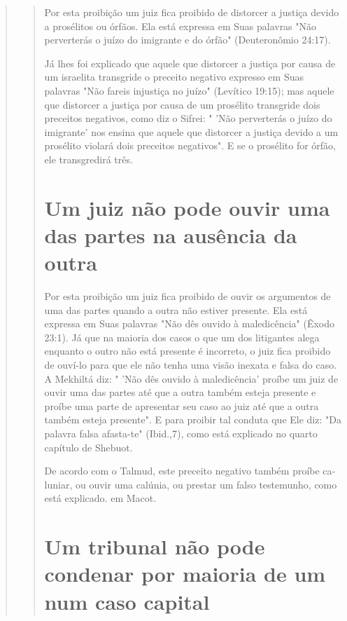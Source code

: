 \begin{quote}
\begin{quote}
Por esta proibição um juiz fica proibido de distorcer a justiça devi­do
a prosélitos ou órfãos. Ela está expressa em Suas palavras "Não
perverterás o juízo do imigrante e do órfão" (Deuteronômio 24:17).

Já lhes foi explicado que aquele que distorcer a justiça por causa de um
israelita transgride o preceito negativo expresso em Suas palavras "Não
fa­reis injustiça no juízo" (Levítico 19:15); mas aquele que distorcer a
justiça por causa de um prosélito transgride dois preceitos negativos,
como diz o Sifrei: " 'Não perverterás o juízo do imigrante' nos ensina
que aquele que distorcer a justiça devido a um prosélito violará dois
preceitos negativos". E se o proséli­to for órfão, ele transgredirá
três.

\section{Um juiz não pode ouvir uma das partes na ausência da outra}

Por esta proibição um juiz fica proibido de ouvir os argumentos de uma
das partes quando a outra não estiver presente. Ela está expressa em
Suas palavras "Não dês ouvido à maledicência" (Êxodo 23:1). Já que na
maioria dos casos o que um dos litigantes alega enquanto o outro não
está presente é incor­reto, o juiz fica proibido de ouví-lo para que ele
não tenha uma visão inexata e falsa do caso. A Mekhiltá diz: " 'Não dês
ouvido à maledicência' proíbe um juiz de ouvir uma das partes até que a
outra também esteja presente e proíbe uma parte de apresentar seu caso
ao juiz até que a outra também esteja presen­te". E para proibir tal
conduta que Ele diz: "Da palavra falsa afasta-te" (Ibid.,7), como está
explicado no quarto capítulo de Shebuot.

De acordo com o Talmud, este preceito negativo também proíbe ca­luniar,
ou ouvir uma calúnia, ou prestar um falso testemunho, como está
expli­cado. em Macot.

\section{Um tribunal não pode condenar por maioria de um num caso capital}


\end{quote}
\end{quote}

